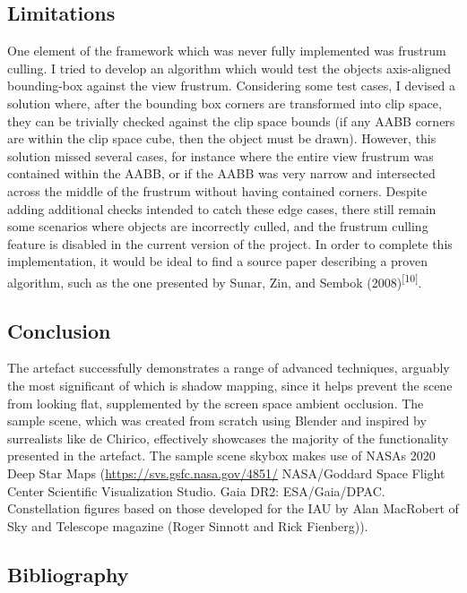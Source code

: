 \documentclass[
]{article}
\begin{document}
{\hypertarget{limitations}{%
\subsection{Limitations}\label{limitations}}

One element of the framework which was never fully implemented was
frustrum culling. I tried to develop an algorithm which would test the
object\textquotesingle s axis-aligned bounding-box against the view
frustrum. Considering some test cases, I devised a solution where, after
the bounding box corners are transformed into clip space, they can be
trivially checked against the clip space bounds (if any AABB corners are
within the clip space cube, then the object must be drawn). However,
this solution missed several cases, for instance where the entire view
frustrum was contained within the AABB, or if the AABB was very narrow
and intersected across the middle of the frustrum without having
contained corners. Despite adding additional checks intended to catch
these edge cases, there still remain some scenarios where objects are
incorrectly culled, and the frustrum culling feature is disabled in the
current version of the project. In order to complete this
implementation, it would be ideal to find a source paper describing a
proven algorithm, such as the one presented by Sunar, Zin, and Sembok
(2008)\textsuperscript{{[}10{]}}.

\hypertarget{conclusion}{%
\subsection{Conclusion}\label{conclusion}}

The artefact successfully demonstrates a range of advanced techniques,
arguably the most significant of which is shadow mapping, since it helps
prevent the scene from looking flat, supplemented by the screen space
ambient occlusion. The sample scene, which was created from scratch
using Blender and inspired by surrealists like de Chirico, effectively
showcases the majority of the functionality presented in the artefact.
The sample scene skybox makes use of NASAs 2020 Deep Star Maps
(\url{https://svs.gsfc.nasa.gov/4851/} NASA/Goddard Space Flight Center
Scientific Visualization Studio. Gaia DR2: ESA/Gaia/DPAC. Constellation
figures based on those developed for the IAU by Alan MacRobert of Sky
and Telescope magazine (Roger Sinnott and Rick Fienberg)).

\hypertarget{bibliography}{%
\subsection{Bibliography}\label{bibliography}}

}
\end{document}
